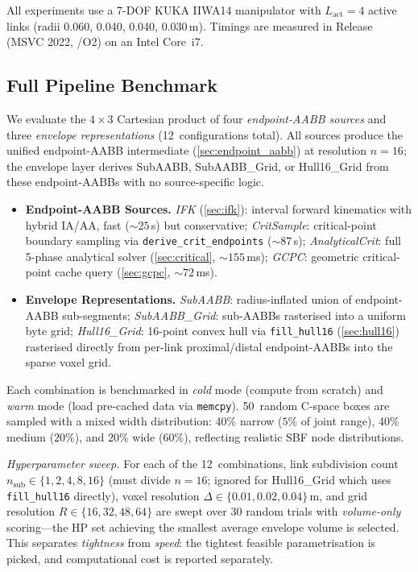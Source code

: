 \documentclass[journal]{IEEEtran}
\begin{document}

All experiments use a 7-DOF KUKA IIWA14 manipulator with
$L_\text{act}{=}4$ active links (radii 0.060, 0.040, 0.040, 0.030\,m).
Timings are measured in Release (MSVC 2022, /O2) on an Intel Core~i7.

\subsection{Full Pipeline Benchmark}\label{sec:exp_pipeline}

We evaluate the $4{\times}3$ Cartesian product of four
\emph{endpoint-AABB sources} and three \emph{envelope representations}
(12~configurations total).
All sources produce the unified endpoint-AABB intermediate
(\cref{sec:endpoint_aabb}) at resolution $n{=}16$;
the envelope layer derives SubAABB, SubAABB\_Grid, or Hull16\_Grid
from these endpoint-AABBs with no source-specific logic.

\begin{itemize}
  \item \textbf{Endpoint-AABB Sources.}
    \emph{IFK} (\cref{sec:ifk}): interval forward kinematics
    with hybrid IA/AA, fast (${\sim}25$\,\textmu s) but conservative;
    \emph{CritSample}: critical-point boundary sampling
    via \texttt{derive\_crit\_endpoints} (${\sim}87$\,\textmu s);
    \emph{AnalyticalCrit}: full 5-phase analytical solver
    (\cref{sec:critical}, ${\sim}155$\,ms);
    \emph{GCPC}: geometric critical-point cache query
    (\cref{sec:gcpc}, ${\sim}72$\,ms).
  \item \textbf{Envelope Representations.}
    \emph{SubAABB}: radius-inflated union of endpoint-AABB sub-segments;
    \emph{SubAABB\_Grid}: sub-AABBs rasterised into a uniform byte grid;
    \emph{Hull16\_Grid}: 16-point convex hull via \texttt{fill\_hull16}
    (\cref{sec:hull16}) rasterised directly from per-link proximal/distal
    endpoint-AABBs into the sparse voxel grid.
\end{itemize}
Each combination is benchmarked in
\emph{cold} mode (compute from scratch) and
\emph{warm} mode (load pre-cached data via \texttt{memcpy}).
50~random C-space boxes are sampled with a mixed width distribution:
40\% narrow ($5\%$ of joint range), 40\% medium ($20\%$), and
20\% wide ($60\%$), reflecting realistic SBF node distributions.

\emph{Hyperparameter sweep.}
For each of the 12~combinations, link subdivision count
$n_\text{sub} \in \{1,2,4,8,16\}$ (must divide $n{=}16$;
ignored for Hull16\_Grid which uses \texttt{fill\_hull16} directly),
voxel resolution
$\Delta \in \{0.01, 0.02, 0.04\}$\,m,
and grid resolution $R \in \{16,32,48,64\}$
are swept over 30 random trials with
\emph{volume-only} scoring---the HP set achieving the
smallest average envelope volume is selected.
This separates \emph{tightness} from \emph{speed}:
the tightest feasible parametrisation is picked, and
computational cost is reported separately.
\end{document}
